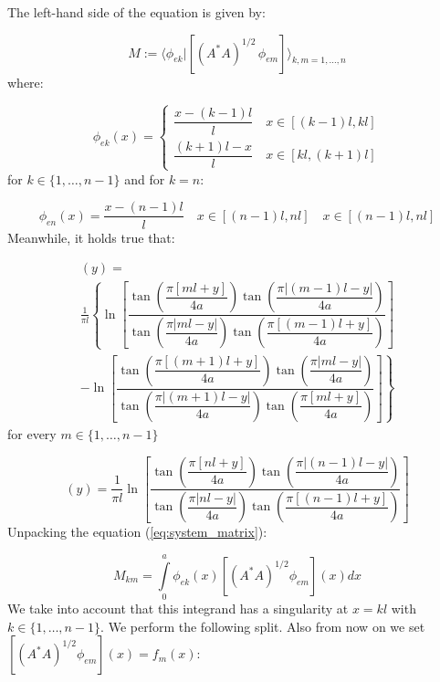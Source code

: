 \documentclass[12pt,letterpaper]{article}
\theoremstyle{definition}
\numberwithin{equation}{subsection}
\begin{document}
The left-hand side of the equation is given by:

\begin{equation} \label{eq:system_matrix}
    M := \langle \phi_{ek} | [(A^*A)^{1/2} \, \phi_{em}] \rangle_{k,m=1,\dots,n}
\end{equation}
where:

\begin{equation}
    \phi_{ek}(x) =
    \begin{cases}
        \dfrac{x - (k-1)l}{l} \quad x \in [(k-1)l, kl] \\[10pt]
        \dfrac{(k+1)l - x}{l} \quad x \in [kl, (k+1)l]
    \end{cases}
\end{equation}
for $k \in \{1, \dots, n-1\}$ and for $k=n$:

\begin{equation}
    \phi_{en}(x) =
    \dfrac{x - (n-1)l}{l} \quad x \in [(n-1)l, nl] \quad x \in [(n-1)l, nl]
\end{equation}
Meanwhile, it holds true that:

\begin{multline}
    [(A^*A)^{1/2}\phi_{em}](y) = \\ \frac{1}{\pi l}\left\{ \ln{\left[\dfrac{\tan{\left(\dfrac{\pi[ml+y]}{4a}\right)}\tan{\left(\dfrac{\pi|(m-1)l-y|}{4a}\right)}}{\tan{\left(\dfrac{\pi|ml-y|}{4a}\right)}\tan{\left(\dfrac{\pi[(m-1)l+y]}{4a}\right)}}\right]} \right. \\
     \left. -  \ln{\left[\dfrac{\tan{\left(\dfrac{\pi[(m+1)l+y]}{4a}\right)}\tan{\left(\dfrac{\pi|ml-y|}{4a}\right)}}{\tan{\left(\dfrac{\pi|(m+1)l-y|}{4a}\right)}\tan{\left(\dfrac{\pi[ml+y]}{4a}\right)}}\right]}\right\}
\end{multline}
for every $m \in \{1,\dots,n-1\}$

\begin{equation}
    [(A^*A)^{1/2}\phi_{en}](y) = \frac{1}{\pi l} \ln{\left[\dfrac{\tan{\left(\dfrac{\pi[nl+y]}{4a}\right)}\tan{\left(\dfrac{\pi|(n-1)l-y|}{4a}\right)}}{\tan{\left(\dfrac{\pi|nl-y|}{4a}\right)}\tan{\left(\dfrac{\pi[(n-1)l+y]}{4a}\right)}}\right]}   
\end{equation}
Unpacking the equation (\ref{eq:system_matrix}):

\begin{equation}
    M_{km} = \int\limits_0^a \phi_{ek} (x)[(A^*A)^{1/2}\phi_{em}](x)dx
\end{equation}
We take into account that this integrand has a singularity at $x=kl$ with $k \in \{1, \dots, n-1\}$. We perform the following split. Also from now on we set $[(A^*A)^{1/2}\phi_{em}](x) = f_m(x)$:
\end{document}
